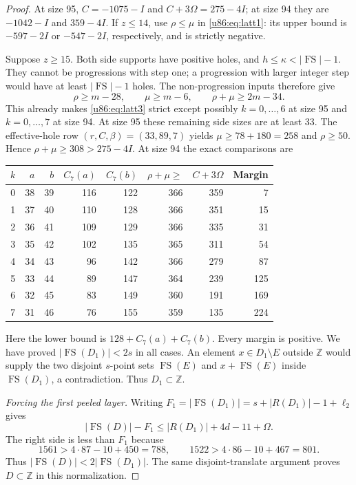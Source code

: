 \documentclass[11pt,a4paper]{article}
\theoremstyle{remark}
\newcommand{\FS}{\operatorname{FS}}
\newcommand{\Z}{\mathbb Z}
\begin{document}
\begin{proof}
At size 95, $C=-1075-I$ and $C+3\Omega=275-4I$; at size 94 they are
$-1042-I$ and $359-4I$. If $z\le14$, use $\rho\le\mu$ in
\eqref{u86:eq:latt1}: its upper bound is $-597-2I$ or $-547-2I$, respectively,
and is strictly negative.

Suppose $z\ge15$. Both side supports have positive holes, and
$h\le\kappa<|\FS|-1$. They cannot be progressions with step one; a
progression with larger integer step would have at least $|\FS|-1$
holes. The non-progression inputs therefore give
\[
 \rho\ge m-28,\qquad\mu\ge m-6,\qquad\rho+\mu\ge2m-34.
\]
This already makes \eqref{u86:eq:latt3} strict except possibly $k=0,\ldots,6$
at size 95 and $k=0,\ldots,7$ at size 94.
At size 95 these remaining side sizes are at least 33. The effective-hole
row $(r,C,\beta)=(33,89,7)$ yields $\mu\ge78+180=258$ and
$\rho\ge50$. Hence $\rho+\mu\ge308>275-4I$.
At size 94 the exact comparisons are
\begin{center}\small
\begin{tabular}{rrrrrrrr}
\toprule
$k$&$a$&$b$&$C_7(a)$&$C_7(b)$&$\rho+\mu\ge$&$C+3\Omega$&Margin\\\midrule
0&38&39&116&122&366&359&7\\
1&37&40&110&128&366&351&15\\
2&36&41&109&129&366&335&31\\
3&35&42&102&135&365&311&54\\
4&34&43&96&142&366&279&87\\
5&33&44&89&147&364&239&125\\
6&32&45&83&149&360&191&169\\
7&31&46&76&155&359&135&224\\\bottomrule
\end{tabular}
\end{center}
Here the lower bound is $128+C_7(a)+C_7(b)$. Every margin is positive.
We have proved $|\FS(D_1)|<2s$ in all cases. An element
$x\in D_1\setminus E$ outside $\Z$ would supply the two disjoint
$s$-point sets $\FS(E)$ and $x+\FS(E)$ inside $\FS(D_1)$, a contradiction.
Thus $D_1\subset\Z$.

\emph{Forcing the first peeled layer.}
Writing $F_1=|\FS(D_1)|=s+|R(D_1)|-1+\ell_2$ gives
\[
 |\FS(D)|-F_1\le|R(D_1)|+4d-11+\Omega.
\]
The right side is less than $F_1$ because
\[
 1561>4\cdot87-10+450=788,\qquad
 1522>4\cdot86-10+467=801.
\]
Thus $|\FS(D)|<2|\FS(D_1)|$. The same disjoint-translate argument proves
$D\subset\Z$ in this normalization.


\end{proof}
\end{document}
